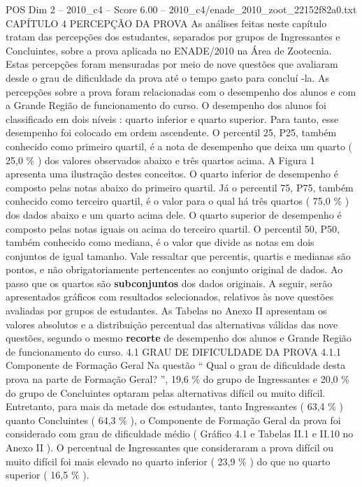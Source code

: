 \begin{textsample}{POS Dim 2 – 2010\_c4 – Score 6.00 – 2010\_c4/enade\_2010\_zoot\_22152f82a0.txt}  \label{ex:f2_pos_148}
CAPÍTULO 4 PERCEPÇÃO DA PROVA As análises feitas neste capítulo tratam das percepções dos estudantes, separados por grupos de Ingressantes e Concluintes, sobre a prova aplicada no ENADE/2010 na Área de Zootecnia.
Estas percepções foram mensuradas por meio de nove questões que avaliaram desde o grau de dificuldade da prova até o tempo gasto para concluí -la.
As percepções sobre a prova foram relacionadas com o desempenho dos alunos e com a Grande Região de funcionamento do curso.
O desempenho dos alunos foi classificado em dois níveis : quarto inferior e quarto superior.
Para tanto, esse desempenho foi colocado em ordem ascendente.
O percentil 25, P25, também conhecido como primeiro quartil, é a nota de desempenho que deixa um quarto ( 25,0 \% ) dos valores observados abaixo e três quartos acima.
A Figura 1 apresenta uma ilustração destes conceitos.
O quarto inferior de desempenho é composto pelas notas abaixo do primeiro quartil.
Já o percentil 75, P75, também conhecido como terceiro quartil, é o valor para o qual há três quartos ( 75,0 \% ) dos dados abaixo e um quarto acima dele.
O quarto superior de desempenho é composto pelas notas iguais ou acima do terceiro quartil.
O percentil 50, P50, também conhecido como mediana, é o valor que divide as notas em dois conjuntos de igual tamanho.
Vale ressaltar que percentis, quartis e medianas são pontos, e não obrigatoriamente pertencentes ao conjunto original de dados.
Ao passo que os quartos são \textbf{subconjuntos} dos dados originais.
A seguir, serão apresentados gráficos com resultados selecionados, relativos às nove questões avaliadas por grupos de estudantes.
As Tabelas no Anexo II apresentam os valores absolutos e a distribuição percentual das alternativas válidas das nove questões, segundo o mesmo \textbf{recorte} de desempenho dos alunos e Grande Região de funcionamento do curso. 4.1 GRAU DE DIFICULDADE DA PROVA 4.1.1 Componente de Formação Geral Na questão “ Qual o grau de dificuldade desta prova na parte de Formação Geral? ”, 19,6 \% do grupo de Ingressantes e 20,0 \% do grupo de Concluintes optaram pelas alternativas difícil ou muito difícil.
Entretanto, para mais da metade dos estudantes, tanto Ingressantes ( 63,4 \% ) quanto Concluintes ( 64,3 \% ), o Componente de Formação Geral da prova foi considerado com grau de dificuldade médio ( Gráfico 4.1 e Tabelas II.1 e II.10 no Anexo II ).
O percentual de Ingressantes que consideraram a prova difícil ou muito difícil foi mais elevado no quarto inferior ( 23,9 \% ) do que no quarto superior ( 16,5 \% ).

\end{textsample}
